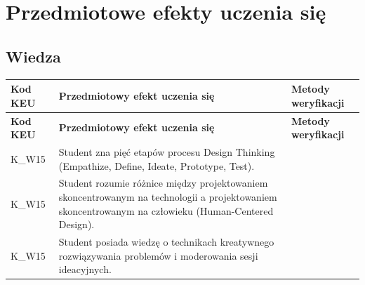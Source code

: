 \documentclass[12pt, a4paper]{article}
\newcommand{\thdrule}{\noalign{\global\setlength{\extrarowheight}{0pt}}}
\newcommand{\thdend}{\noalign{\global\setlength{\extrarowheight}{3pt}}}
\begin{document}
\section{Przedmiotowe efekty uczenia się}

\subsection*{Wiedza}
{\scriptsize
\begin{longtable}{m{1.6cm}m{9.0cm}m{4.2cm}}
\thdrule\toprule
\rowcolor{pjatkRed} {\color{white}\footnotesize\textbf{\vphantom{Ag}Kod KEU}} & {\color{white}\footnotesize\textbf{\vphantom{Ag}Przedmiotowy efekt uczenia się}} & {\color{white}\footnotesize\textbf{\vphantom{Ag}Metody weryfikacji}} \\
\midrule\thdend
\endfirsthead
\thdrule\toprule
\rowcolor{pjatkRed} {\color{white}\footnotesize\textbf{\vphantom{Ag}Kod KEU}} & {\color{white}\footnotesize\textbf{\vphantom{Ag}Przedmiotowy efekt uczenia się}} & {\color{white}\footnotesize\textbf{\vphantom{Ag}Metody weryfikacji}} \\
\midrule\thdend
\endhead
  \rowcolor{tableRowLight} K\_W15 & Student zna pięć etapów procesu Design Thinking (Empathize, Define, Ideate, Prototype, Test). &  \\
  \rowcolor{tableRowAlt} K\_W15 & Student rozumie różnice między projektowaniem skoncentrowanym na technologii a projektowaniem skoncentrowanym na człowieku (Human-Centered Design). &  \\
  \rowcolor{tableRowLight} K\_W15 & Student posiada wiedzę o technikach kreatywnego rozwiązywania problemów i moderowania sesji ideacyjnych. &  \\
\bottomrule
\end{longtable}}
\end{document}
